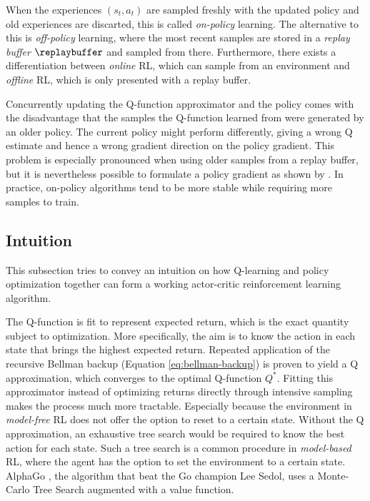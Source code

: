 When the experiences $(s_t, a_t)$ are sampled freshly with the updated policy and old experiences are discarted, this is called \textit{on-policy} learning. The alternative to this is \textit{off-policy} learning, where the most recent samples are stored in a \textit{replay buffer} $\replaybuffer$ and sampled from there. Furthermore, there exists a differentiation between \textit{online} RL, which can sample from an environment and \textit{offline} RL, which is only presented with a replay buffer. 

Concurrently updating the Q-function approximator and the policy comes with the disadvantage that the samples the Q-function learned from were generated by an older policy. The current policy might perform differently, giving a wrong Q estimate and hence a wrong gradient direction on the policy gradient. This problem is especially pronounced when using older samples from a replay buffer, but it is nevertheless possible to formulate a policy gradient as shown by \citet{degrisOffPolicyActorCritic2013}. In practice, on-policy algorithms tend to be more stable while requiring more samples to train.

\subsection{Intuition}

\begin{summary}
This subsection tries to convey an intuition on how Q-learning and policy optimization together can form a working actor-critic reinforcement learning algorithm.
\end{summary}

The Q-function is fit to represent expected return, which is the exact quantity subject to optimization. More specifically, the aim is to know the action in each state that brings the highest expected return. Repeated application of the recursive Bellman backup (Equation \ref{eq:bellman-backup}) is proven to yield a Q approximation, which converges to the optimal Q-function $Q^*$. Fitting this approximator instead of optimizing returns directly through intensive sampling makes the process much more tractable. Especially because the environment in \textit{model-free} RL does not offer the option to reset to a certain state. Without the Q approximation, an exhaustive tree search would be required to know the best action for each state. Such a tree search is a common procedure in \textit{model-based} RL, where the agent has the option to set the environment to a certain state. AlphaGo \cite{silverMasteringGameGo2016}, the algorithm that beat the Go champion Lee Sedol, uses a Monte-Carlo Tree Search augmented with a value function.

